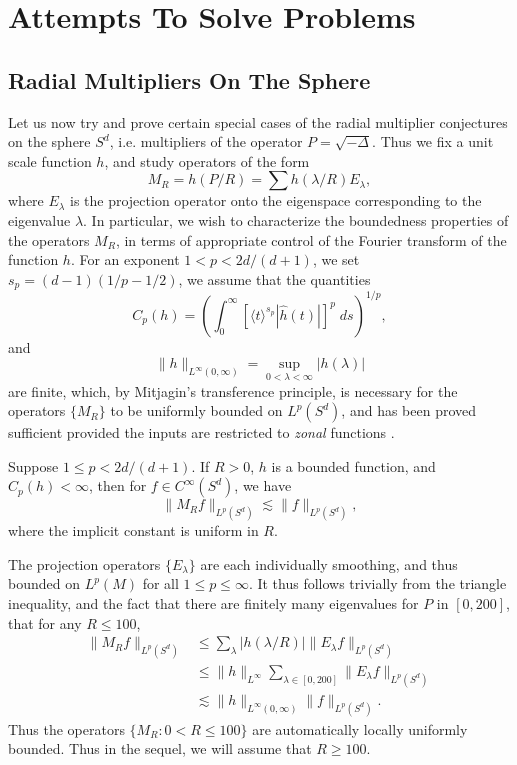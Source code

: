 \part{Attempts To Solve Problems}

\chapter{Radial Multipliers On The Sphere}

Let us now try and prove certain special cases of the radial multiplier conjectures on the sphere $S^d$, i.e. multipliers of the operator $P = \sqrt{-\Delta}$. Thus we fix a unit scale function $h$, and study operators of the form
%
\[ M_R = h \left( P / R \right) = \sum h(\lambda / R) E_\lambda, \]
%
where $E_\lambda$ is the projection operator onto the eigenspace corresponding to the eigenvalue $\lambda$. In particular, we wish to characterize the boundedness properties of the operators $M_R$, in terms of appropriate control of the Fourier transform of the function $h$. For an exponent $1 < p < 2d/(d+1)$, we set $s_p = (d-1)(1/p - 1/2)$, we assume that the quantities
%
\[ C_p(h) = \left( \int_0^\infty \left[ \langle t \rangle^{s_p} |\widehat{h}(t)| \right]^p\; ds \right)^{1/p}, \]
%
and
%
\[ \| h \|_{L^\infty(0,\infty)} = \sup_{0 < \lambda < \infty} |h(\lambda)| \]
%
are finite, which, by Mitjagin's transference principle, is necessary for the operators $\{ M_R \}$ to be uniformly bounded on $L^p(S^d)$, and has been proved sufficient provided the inputs are restricted to \emph{zonal} functions \cite{Alladi}.

\begin{theorem} \label{MainSphereTheorem}
    Suppose $1 \leq p < 2d/(d+1)$. If $R > 0$, $h$ is a bounded function, and $C_p(h) < \infty$, then for $f \in C^\infty(S^d)$, we have
    \[ \| M_R f \|_{L^p(S^d)} \lesssim \| f \|_{L^p(S^d)}, \]
    where the implicit constant is uniform in $R$.
\end{theorem}

The projection operators $\{ E_\lambda \}$ are each individually smoothing, and thus bounded on $L^p(M)$ for all $1 \leq p \leq \infty$. It thus follows trivially from the triangle inequality, and the fact that there are finitely many eigenvalues for $P$ in $[0,200]$, that for any $R \leq 100$,
%
\begin{align*}
    \| M_R f \|_{L^p(S^d)} &\leq \sum_\lambda |h(\lambda/R)| \| E_\lambda f \|_{L^p(S^d)}\\
    &\leq \| h \|_{L^\infty} \sum\nolimits_{\lambda \in [0,200]} \| E_\lambda f \|_{L^p(S^d)}\\
    &\lesssim \| h \|_{L^\infty(0,\infty)} \| f \|_{L^p(S^d)}.
\end{align*}
%
Thus the operators $\{ M_R : 0 < R \leq 100 \}$ are automatically locally uniformly bounded. Thus in the sequel, we will assume that $R \geq 100$.

